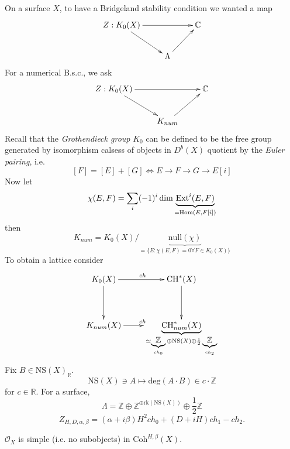On a surface $X$, to have a Bridgeland stability condition we wanted a map
$$
\xymatrix{
Z:K_0(X)\ar[rr]\ar[dr]&  &  \mathbb{C}\\
&  \Lambda\ar[ur]
}
$$
For a numerical B.s.c., we ask
$$
\xymatrix{
Z:K_0(X)\ar[rr]\ar[dr]&  &  \mathbb{C}\\
&  K_{num}\ar[ur]
}
$$
Recall that the {\it Grothendieck group} $K_0$ can be defined to be the free
group generated by isomorphism calsess of objects in $D^b(X)$ quotient by the
{\it Euler pairing}, i.e.
$$
[F]=[E]+[G] \iff E \to F \to G \to E[i]
$$
Now let
$$
\chi(E,F)=\sum_{i}(-1)^{i}\dim \underbrace{\text{Ext}^i(E,F)}
_{=\mathop{\mathrm{Hom}}\nolimits(E,F[i])}
$$
then
$$
K_{num}=K_0(X)/\underbrace{\text{null}(\chi)}
_{=\{E:\chi(E,F)=0\forall F\in K_0(X)\}}
$$
To obtain a lattice consider
$$
\xymatrix{
K_0(X)\ar[d]\ar[r]^{ch}& \CH^* (X)\ar[d]\\
K_{num}(X)\ar[r]^{ch}&\underbrace{\CH^*_{num}(X)}
_{\simeq \underbrace{\mathbb{Z}}_{ch_0} \oplus \text{NS}(X) \oplus
\frac{1}{2}\underbrace{\mathbb{Z}}_{ch_2}}
}
$$
Fix $B \in \text{NS}(X)_{\mathbb{R}}$.
$$
\text{NS}(X)\ni A \mapsto \text{deg}(A\cdot B) \in c\cdot \mathbb{Z}
$$
for $c \in \mathbb{R}$. For a surface,
$$
\Lambda = \mathbb{Z} \oplus \mathbb{Z}^{\oplus \text{rk}(\text{NS}(X))}
\oplus \frac{1}{2}\mathbb{Z}
$$
$$
Z_{H,D,\alpha,\beta}=(\alpha+i \beta)H^2 ch_0+(D+iH)ch_1-ch_2.
$$

\begin{exercise}
\label{exercise-Ox-is-simple}
$\mathcal{O}_X$ is simple (i.e. no subobjects) in $\text{Coh}^{H,\beta}(X)$.
\end{exercise}


